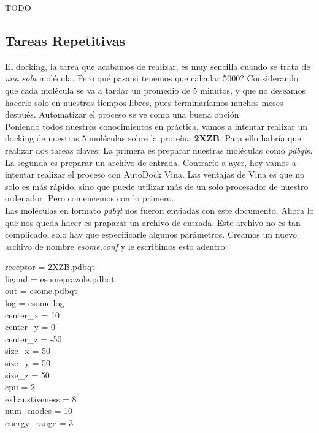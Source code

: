 \documentclass[10pt,letterpaper]{article}
\newenvironment{Code}
{
\begin{lrbox}{\selvestebox}%
\begin{minipage}{\dimexpr\columnwidth-2\fboxsep\relax}
\fontfamily{\ttdefault}\selectfont
}
{\end{minipage}\end{lrbox}%
\begin{center}
\colorbox{light-gray}{\usebox{\selvestebox}}
\end{center}
}
\begin{document}
TODO

\subsection{Tareas Repetitivas}
El docking, la tarea que acabamos de realizar, es muy sencilla cuando se trata de \emph{una sola} mol\'ecula. Pero qu\'e pasa si tenemos que calcular 5000? Considerando que cada mol\'ecula se va a tardar un promedio de 5 minutos, y que no deseamos hacerlo solo en nuestros tiempos libres, pues terminar\'iamos muchos meses despu\'es. Automatizar el proceso se ve como una buena opci\'on.\\

Poniendo todos nuestros conocimientos en pr\'actica, vamos a intentar realizar un docking de nuestras 5 mol\'eculas sobre la prote\'ina \textbf{2XZB}. Para ello habr\'ia que realizar dos tareas claves: La primera es preparar nuestras mol\'eculas como \textit{pdbqt}s. La segunda es preparar un archivo de entrada. Contrario a ayer, hoy vamos a intentar realizar el proceso con AutoDock Vina. Las ventajas de Vina es que no solo es m\'as r\'apido, sino que puede utilizar m\'as de un solo procesador de nuestro ordenador. Pero comencemos con lo primero.\\

Las mol\'eculas en formato \textit{pdbqt} nos fueron enviadas con este documento. Ahora lo que nos queda hacer es praparar un archivo de entrada. Este archivo no es tan complicado, solo hay que especificarle algunos par\'ametros. Creamos un nuevo archivo de nombre \emph{esome.conf} y le escribimos esto adentro:

\begin{Code}
receptor = 2XZB.pdbqt\\
ligand = esomeprazole.pdbqt\\
out = esome.pdbqt\\
log = esome.log\\
center\_x = 10\\
center\_y = 0\\
center\_z = -50\\
size\_x = 50\\
size\_y = 50\\
size\_z = 50\\
cpu = 2\\
exhaustiveness = 8\\
num\_modes = 10\\
energy\_range = 3
\end{Code}
\end{document}

